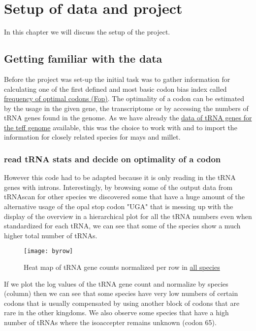 \chapter{Setup of data and project}
In this chapter we will discuss the setup of the project.

\section{Getting familiar with the data}
Before the project was set-up the initial task was to gather information for calculating one of the first defined and most basic codon bias index called \hyperlink{function:Fop}{frequency of optimal codons (Fop)}. The optimality of a codon can be estimated by the usage in the given gene, the transcriptome or by accessing the numbers of tRNA genes found in the genome. As we have already the \hyperlink{data:tRNAlist}{data of tRNA genes for the teff genome} available, this was the choice to work with and to import the information for closely related species for mays and millet.

\subsection{read tRNA stats and decide on optimality of a codon}
  
      
 
However this code had to be adapted because it is only reading in the tRNA genes with introns. Interestingly, by browsing some of the output data from tRNAscan for other species we discovered some that have a huge amount of the alternative usage of the opal stop codon "UGA" that is messing up with the display of the overview in a hierarchical plot for all the tRNA numbers even when standardized for each tRNA, we can see that some of the species show a much higher total number of tRNAs. 

\begin{figure}[tb] 
\centering 
\texttt{[image: byrow]} 
\caption[Heat map for tRNA counts]{Heat map of tRNA gene counts normalized per row in \hyperlink{data:veab}{all species}}
\label{fig:byrow} 
\end{figure}

If we plot the log values of the tRNA gene count and normalize by species (column) then we can see that some species have very low numbers of certain codons that is usually compensated by using another block of codons that are rare in the other kingdoms. We also observe some species that have a high number of tRNAs where the isoaccepter remains unknown (codon 65).


